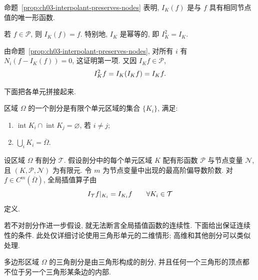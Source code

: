 \begin{Remark}
\label{rem:ch03-interpolant-unique-shape-function}
命题~\ref{prop:ch03-interpolant-preserves-nodes} 表明, $I_K(f)$ 是与 $f$ 具有相同节点值的唯一形函数.
\end{Remark}

\begin{Proposition}
\label{prop:ch03-interpolant-projection}
若 $f\in\mathcal P$, 则 $I_K(f)=f$. 特别地, $I_K$ 是幂等的, 即 $I_K^2=I_K$.
\end{Proposition}
\begin{Proof}
由命题~\ref{prop:ch03-interpolant-preserves-nodes}, 对所有 $i$ 有 $N_i(f-I_K(f))=0$, 这证明第一项. 又因 $I_Kf\in\mathcal P$,
\[
\MathBookFormulaID{formula-ch03-interpolant-idempotent}
I_K^2f=I_K(I_Kf)=I_Kf.
\]
\end{Proof}

下面把各单元拼接起来.

\begin{Definition}
\label{def:ch03-domain-subdivision}
区域 $\Omega$ 的一个剖分是有限个单元区域的集合 $\{K_i\}$, 满足:
\begin{enumerate}
\item $\operatorname{int}K_i\cap\operatorname{int}K_j=\varnothing$, 若 $i\ne j$;
\item $\bigcup_iK_i=\overline\Omega$.
\end{enumerate}
\end{Definition}

\begin{Definition}
\label{def:ch03-global-interpolant}
设区域 $\Omega$ 有剖分 $\mathcal T$. 假设剖分中的每个单元区域 $K$ 配有形函数 $\mathcal P$ 与节点变量 $\mathcal N$, 且 $(K,\mathcal P,\mathcal N)$ 为有限元. 令 $m$ 为节点变量中出现的最高阶偏导数阶数. 对 $f\in C^m(\overline\Omega)$, 全局插值算子由
\setcounter{equation}{9}
\begin{equation}
\MathBookFormulaID{formula-ch03-global-interpolant}
\label{eq:ch03-global-interpolant}
I_{\mathcal T}f|_{K_i}=I_{K_i}f\qquad\forall K_i\in\mathcal T
\end{equation}
定义.
\end{Definition}

若不对剖分作进一步假设, 就无法断言全局插值函数的连续性. 下面给出保证连续性的条件. 此处仅详细讨论使用三角形单元的二维情形; 高维和其他剖分可以类似处理.

\setcounter{thmcount}{10}
\begin{Definition}
\label{def:ch03-triangulation}
多边形区域 $\Omega$ 的三角剖分是由三角形构成的剖分, 并且任何一个三角形的顶点都不位于另一个三角形某条边的内部.
\end{Definition}


